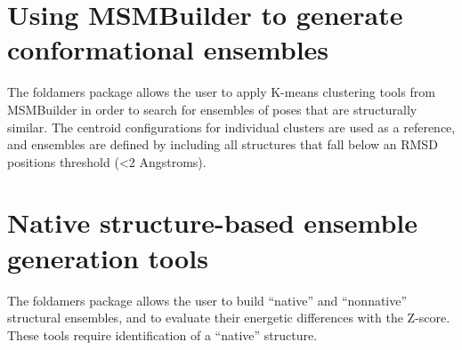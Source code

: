 \documentclass[letterpaper,12pt,english,openany,oneside]{sphinxmanual}
\begin{document}
\section{Using MSMBuilder to generate conformational ensembles}
\label{\detokenize{ensembles:using-msmbuilder-to-generate-conformational-ensembles}}
The foldamers package allows the user to apply K-means clustering tools from MSMBuilder in order to search for ensembles of poses that are structurally similar.  The centroid configurations for individual clusters are used as a reference, and ensembles are defined by including all structures that fall below an RMSD positions threshold (\textless{}2 Angstroms).


\section{Native structure-based ensemble generation tools}
\label{\detokenize{ensembles:native-structure-based-ensemble-generation-tools}}
The foldamers package allows the user to build “native” and “nonnative” structural ensembles, and to evaluate their energetic differences with the Z-score.  These tools require identification of a “native” structure.

\label{\detokenize{ensembles:module-ensembles.ens_build}}

\begin{fulllineitems}
\label{\detokenize{ensembles:ensembles.ens_build.get_ensembles}}
\end{fulllineitems}


\begin{fulllineitems}
\label{\detokenize{ensembles:ensembles.ens_build.get_native_ensemble}}
\end{fulllineitems}
\end{document}
